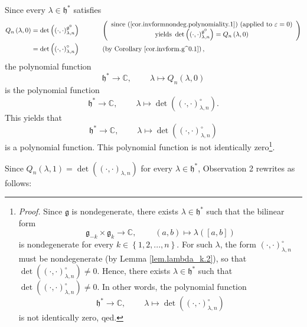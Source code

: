 \documentclass
[numbers=enddot,12pt,final,onecolumn,german,notitlepage]{scrartcl}%
\theoremstyle{definition}
\begin{document}
Since every $\lambda\in\mathfrak{h}^{\ast}$ satisfies%
\begin{align*}
Q_{n}\left(  \lambda,0\right)   &  =\det\left(  \left(  \cdot,\cdot\right)
_{\lambda,n}^{\mathfrak{g}^{0}}\right)  \ \ \ \ \ \ \ \ \ \ \left(
\begin{array}
[c]{c}%
\text{since (\ref{cor.invformnondeg.polynomiality.1}) (applied to }%
\varepsilon=0\text{)}\\
\text{yields }\det\left(  \left(  \cdot,\cdot\right)  _{\lambda,n}%
^{\mathfrak{g}^{0}}\right)  =Q_{n}\left(  \lambda,0\right)
\end{array}
\right) \\
&  =\det\left(  \left(  \cdot,\cdot\right)  _{\lambda,n}^{\circ}\right)
\ \ \ \ \ \ \ \ \ \ \left(  \text{by Corollary \ref{cor.invform.g^0.1}%
}\right)  ,
\end{align*}
the polynomial function%
\[
\mathfrak{h}^{\ast}\rightarrow\mathbb{C},\ \ \ \ \ \ \ \ \ \ \lambda\mapsto
Q_{n}\left(  \lambda,0\right)
\]
is the polynomial function%
\[
\mathfrak{h}^{\ast}\rightarrow\mathbb{C},\ \ \ \ \ \ \ \ \ \ \lambda
\mapsto\det\left(  \left(  \cdot,\cdot\right)  _{\lambda,n}^{\circ}\right)  .
\]
This yields that%
\[
\mathfrak{h}^{\ast}\rightarrow\mathbb{C},\ \ \ \ \ \ \ \ \ \ \lambda
\mapsto\det\left(  \left(  \cdot,\cdot\right)  _{\lambda,n}^{\circ}\right)
\]
is a polynomial function. This polynomial function is not identically
zero\footnote{\textit{Proof.} Since $\mathfrak{g}$ is nondegenerate, there
exists $\lambda\in\mathfrak{h}^{\ast}$ such that the bilinear form%
\[
\mathfrak{g}_{-k}\times\mathfrak{g}_{k}\rightarrow\mathbb{C}%
,\ \ \ \ \ \ \ \ \ \ \left(  a,b\right)  \mapsto\lambda\left(  \left[
a,b\right]  \right)
\]
is nondegenerate for every $k\in\left\{  1,2,...,n\right\}  $. For such
$\lambda$, the form $\left(  \cdot,\cdot\right)  _{\lambda,n}^{\circ}$ must be
nondegenerate (by Lemma \ref{lem.lambda_k.2}), so that $\det\left(  \left(
\cdot,\cdot\right)  _{\lambda,n}^{\circ}\right)  \neq0$. Hence, there exists
$\lambda\in\mathfrak{h}^{\ast}$ such that $\det\left(  \left(  \cdot
,\cdot\right)  _{\lambda,n}^{\circ}\right)  \neq0$. In other words, the
polynomial function%
\[
\mathfrak{h}^{\ast}\rightarrow\mathbb{C},\ \ \ \ \ \ \ \ \ \ \lambda
\mapsto\det\left(  \left(  \cdot,\cdot\right)  _{\lambda,n}^{\circ}\right)
\]
is not identically zero, qed.}.

Since $Q_{n}\left(  \lambda,1\right)  =\det\left(  \left(  \cdot,\cdot\right)
_{\lambda,n}\right)  $ for every $\lambda\in\mathfrak{h}^{\ast}$, Observation
2 rewrites as follows:
\end{document}
